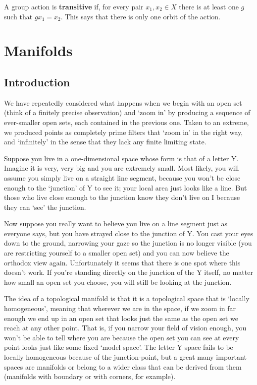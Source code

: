 \documentclass[oneside,english]{amsbook}
\numberwithin{section}{chapter}
\theoremstyle{plain}
\theoremstyle{definition}
\begin{document}
A group action is \textbf{transitive} if, for every pair $x_1, x_2\in X$ there is at least one $g$ such that $gx_1 = x_2$. This says that there is only one orbit of the action.


\chapter{Manifolds}

\section{Introduction}

We have repeatedly considered what happens when we begin with an open set (think of a finitely precise observation) and `zoom in' by producing a sequence of ever-smaller open sets, each contained in the previous one. Taken to an extreme, we produced points as completely prime filters that `zoom in' in the right way, and `infinitely' in the sense that they lack any finite limiting state.

Suppose you live in a one-dimensional space whose form is that of a letter Y. Imagine it is very, very big and you are extremely small. Most likely, you will assume you simply live on a straight line segment, because you won't be close enough to the `junction' of Y to see it; your local area just looks like a line. But those who live close enough to the junction know they don't live on I because they can `see' the junction.

Now suppose you really want to believe you live on a line segment just as everyone says, but you have strayed close to the junction of Y. You cast your eyes down to the ground, narrowing your gaze so the junction is no longer visible (you are restricting yourself to a smaller open set) and you can now believe the orthodox view again. Unfortunately it seems that there is one spot where this doesn't work. If you're standing directly on the junction of the Y itself, no matter how small an open set you choose, you will still be looking at the junction.

The idea of a topological manifold is that it is a topological space that is `locally homogeneous', meaning that wherever we are in the space, if we zoom in far enough we end up in an open set that looks just the same as the open set we reach at any other point. That is, if you narrow your field of vision enough, you won't be able to tell where you are because the open set you can see at every point looks just like some fixed `model space'. The letter Y space fails to be locally homogeneous because of the junction-point, but a great many important spaces are manifolds or belong to a wider class that can be derived from them (manifolds with boundary or with corners, for example).
\end{document}
